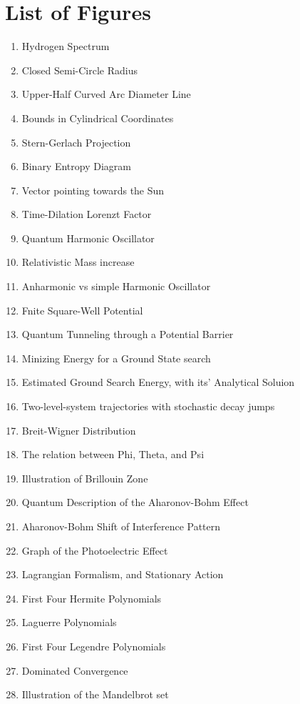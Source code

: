\documentclass[a4paper, 10pt, onepage]{elegantbook}
\begin{document}
\newpage

\section{List of Figures}

\begin{enumerate}

\item Hydrogen Spectrum
\item Closed Semi-Circle Radius
\item Upper-Half Curved Arc Diameter Line
\item Bounds in Cylindrical Coordinates
\item Stern-Gerlach Projection
\item Binary Entropy Diagram
\item Vector pointing towards the Sun
\item Time-Dilation Lorenzt Factor
\item Quantum Harmonic Oscillator
\item Relativistic Mass increase
\item Anharmonic vs simple Harmonic Oscillator
\item Fnite Square-Well Potential
\item Quantum Tunneling through a Potential Barrier
\item Minizing Energy for a Ground State search
\item Estimated Ground Search Energy, with its' Analytical Soluion
\item Two-level-system trajectories with stochastic decay jumps
\item Breit-Wigner Distribution
\item The relation between Phi, Theta, and Psi
\item Illustration of Brillouin Zone
\item Quantum Description of the Aharonov-Bohm Effect
\item Aharonov-Bohm Shift of Interference Pattern
\item Graph of the Photoelectric Effect
\item Lagrangian Formalism, and Stationary Action
\item First Four Hermite Polynomials
\item Laguerre Polynomials
\item First Four Legendre Polynomials
\item Dominated Convergence
\item Illustration of the Mandelbrot set

\end{enumerate}
\end{document}
